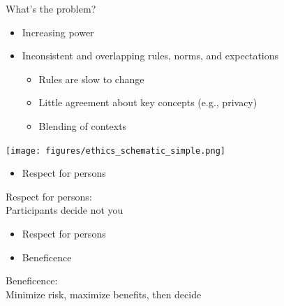 \documentclass{beamer}
\begin{document}
\begin{frame}

What's the problem?
\begin{itemize}
\item Increasing power
\pause
\item Inconsistent and overlapping rules, norms, and expectations
\begin{itemize}
\item Rules are slow to change
\pause
\item Little agreement about key concepts (e.g., privacy)
\pause
\item Blending of contexts
\end{itemize}
\end{itemize}

\end{frame}
\begin{frame}

\begin{center}
\texttt{[image: figures/ethics\_schematic\_simple.png]}
\end{center}

\end{frame}
\begin{frame}

\begin{itemize}
\item Respect for persons
\end{itemize}

\end{frame}
\begin{frame}

Respect for persons:\\
Participants decide not you

\end{frame}
\begin{frame}

\begin{itemize}
\item Respect for persons
\item Beneficence
\end{itemize}

\end{frame}
\begin{frame}

Beneficence:\\
Minimize risk, maximize benefits, then decide

\end{frame}
\end{document}
